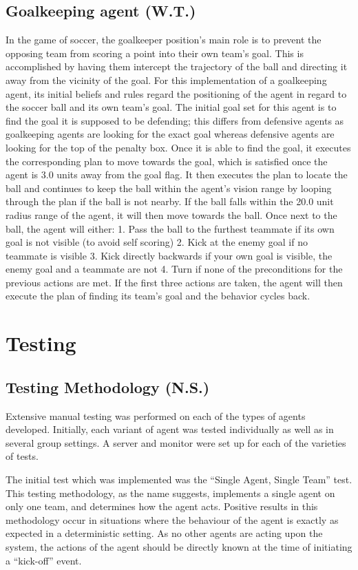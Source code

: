 \documentclass[conference]{IEEEtran}
\begin{document}
\subsection{Goalkeeping agent (W.T.)}
In the game of soccer, the goalkeeper position's main role is to prevent the opposing team from scoring a point into their own team's goal.
This is accomplished by having them intercept the trajectory of the ball and directing it away from the vicinity of the goal.
For this implementation of a goalkeeping agent, its initial beliefs and rules regard the positioning of the agent in regard to the soccer ball and its own team's goal.
The initial goal set for this agent is to find the goal it is supposed to be defending;
this differs from defensive agents as goalkeeping agents are looking for the exact goal whereas defensive agents are looking for the top of the penalty box.
Once it is able to find the goal, it executes the corresponding plan to move towards the goal, which is satisfied once the agent is 3.0 units away from the goal flag.
It then executes the plan to locate the ball and continues to keep the ball within the agent's vision range by looping through the plan if the ball is not nearby.
If the ball falls within the 20.0 unit radius range of the agent, it will then move towards the ball.
Once next to the ball, the agent will either: 1.
Pass the ball to the furthest teammate if its own goal is not visible (to avoid self scoring) 2. Kick at the enemy goal if no teammate is visible 3.
Kick directly backwards if your own goal is visible, the enemy goal and a teammate are not 4.
Turn if none of the preconditions for the previous actions are met.
If the first three actions are taken, the agent will then execute the plan of finding its team's goal and the behavior cycles back.

\section{Testing}
\subsection{Testing Methodology (N.S.)}
Extensive manual testing was performed on each of the types of agents developed.
Initially, each variant of agent was tested individually as well as in several group settings.
A server and monitor were set up for each of the varieties of tests.

The initial test which was implemented was the ``Single Agent, Single Team'' test.
This testing methodology, as the name suggests, implements a single agent on only one team, and determines how the agent acts.
Positive results in this methodology occur in situations where the behaviour of the agent is exactly as expected in a deterministic setting.
As no other agents are acting upon the system, the actions of the agent should be directly known at the time of initiating a ``kick-off'' event.
\end{document}
